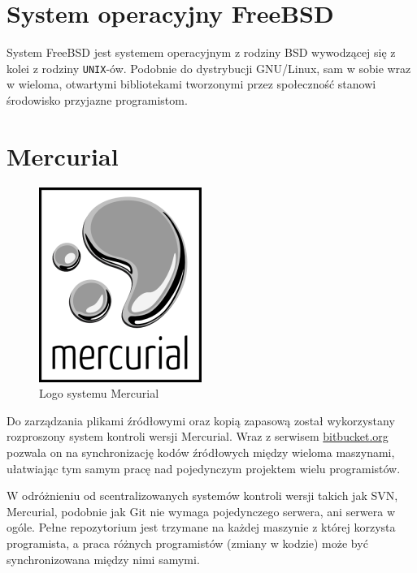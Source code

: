 \section{System operacyjny FreeBSD}
\par
System FreeBSD jest systemem operacyjnym z rodziny BSD wywodzącej się z kolei z rodziny \texttt{UNIX}-ów. Podobnie do dystrybucji GNU/Linux, sam w sobie wraz w wieloma, otwartymi bibliotekami tworzonymi przez społeczność stanowi środowisko przyjazne programistom.

\section{Mercurial}
\begin{figure}
\begin{center}
\includegraphics[scale=0.50]{img/mercurial_logo.png}
\end{center}
\caption{Logo systemu Mercurial}
\end{figure}
\par
Do zarządzania plikami źródłowymi oraz kopią zapasową został wykorzystany rozproszony system kontroli wersji Mercurial. Wraz z serwisem \url{bitbucket.org} pozwala on na synchronizację kodów źródłowych między wieloma maszynami, ułatwiając tym samym pracę nad pojedynczym projektem wielu programistów.
\par
W odróżnieniu od scentralizowanych systemów kontroli wersji takich jak SVN, Mercurial, podobnie jak Git nie wymaga pojedynczego serwera, ani serwera w ogóle. Pełne repozytorium jest trzymane na każdej maszynie z której korzysta programista, a praca różnych programistów (zmiany w kodzie) może być synchronizowana między nimi samymi.

